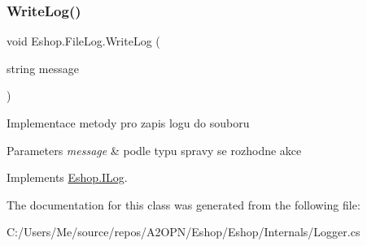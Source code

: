 \subsubsection{\texorpdfstring{WriteLog()}{WriteLog()}}
{\footnotesize\ttfamily void Eshop.\+File\+Log.\+Write\+Log (\begin{DoxyParamCaption}\item[{string}]{message }\end{DoxyParamCaption})}



Implementace metody pro zapis logu do souboru 


\begin{DoxyParams}{Parameters}
{\em message} & podle typu spravy se rozhodne akce\\
\hline
\end{DoxyParams}


Implements \mbox{\hyperlink{interface_eshop_1_1_i_log}{Eshop.\+I\+Log}}.



The documentation for this class was generated from the following file\+:\begin{DoxyCompactItemize}
\item 
C\+:/\+Users/\+Me/source/repos/\+A2\+O\+P\+N/\+Eshop/\+Eshop/\+Internals/Logger.\+cs\end{DoxyCompactItemize}

